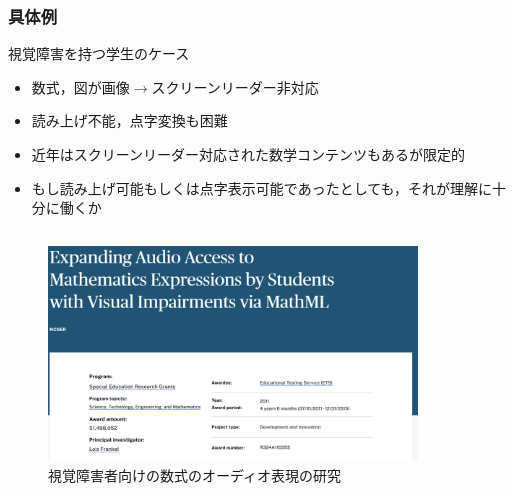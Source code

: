 \documentclass[dvipdfmx,cjk]{beamer}
\theoremstyle{example}
\begin{document}
\begin{frame}
    \frametitle{具体例}
    視覚障害を持つ学生のケース
    \begin{itemize}
        \item 数式，図が画像$\longrightarrow$スクリーンリーダー非対応
        \item 読み上げ不能，点字変換も困難
        \item 近年はスクリーンリーダー対応された数学コンテンツもあるが限定的
        \item もし読み上げ可能もしくは点字表示可能であったとしても，それが理解に十分に働くか
    \end{itemize}
    \begin{columns}
        \begin{column}{0.5\textwidth}
            \begin{figure}
                \centering
                \includegraphics[scale=0.1]{expanding.png}
                \caption{視覚障害者向けの数式のオーディオ表現の研究}
            \end{figure}
        \end{column}
        \begin{column}{0.5\textwidth}
            \begin{figure}
                \centering

\end{figure}
\end{column}
\end{columns}
\end{frame}
\end{document}
